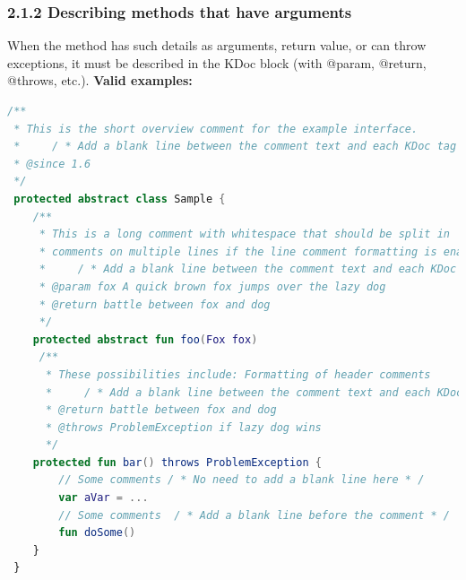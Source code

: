 \subsubsection*{\textbf{2.1.2 Describing methods that have arguments}}
\leavevmode\newline
\label{sec:2.1.2}
When the method has such details as arguments, return value, or can throw exceptions, it must be described in the KDoc block (with @param, @return, @throws, etc.).
\textbf{Valid examples:}
\begin{lstlisting}[language=Kotlin]
/**
 * This is the short overview comment for the example interface.
 *     / * Add a blank line between the comment text and each KDoc tag underneath * /
 * @since 1.6
 */
 protected abstract class Sample {
    /**
     * This is a long comment with whitespace that should be split in
     * comments on multiple lines if the line comment formatting is enabled.
     *     / * Add a blank line between the comment text and each KDoc tag underneath * /
     * @param fox A quick brown fox jumps over the lazy dog
     * @return battle between fox and dog
     */
    protected abstract fun foo(Fox fox)
     /**
      * These possibilities include: Formatting of header comments
      *     / * Add a blank line between the comment text and each KDoc tag underneath * /
      * @return battle between fox and dog
      * @throws ProblemException if lazy dog wins
      */
    protected fun bar() throws ProblemException {
        // Some comments / * No need to add a blank line here * /
        var aVar = ...
        // Some comments  / * Add a blank line before the comment * /
        fun doSome()
    }
 }
\end{lstlisting}
